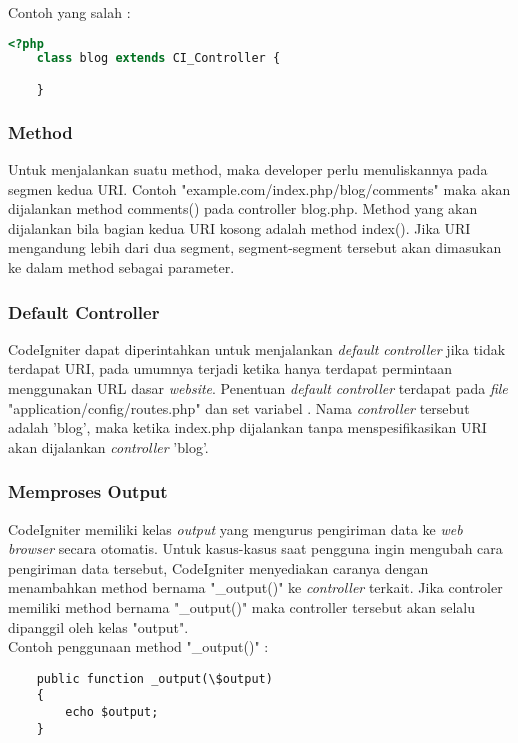 Contoh yang salah :
\begin{lstlisting}[language=PHP]
	<?php
	class blog extends CI_Controller {

	}
\end{lstlisting}
	\subsubsection{Method}
	Untuk menjalankan suatu method, maka developer perlu menuliskannya pada segmen kedua URI. Contoh "example.com/index.php/blog/comments" maka akan dijalankan method comments() pada controller blog.php. Method yang akan dijalankan bila bagian kedua URI kosong adalah method index(). Jika URI mengandung lebih dari dua segment, segment-segment tersebut akan dimasukan ke dalam method sebagai parameter. \cite{CodeIgniter:17}
	
	\subsubsection{Default Controller}
	CodeIgniter dapat diperintahkan untuk menjalankan \textit{default controller} jika tidak terdapat URI, pada umumnya terjadi ketika hanya terdapat permintaan menggunakan URL dasar \textit{website}. Penentuan \textit{default controller} terdapat pada \textit{file} "application/config/routes.php" dan set variabel . Nama \textit{controller} tersebut adalah 'blog', maka ketika index.php dijalankan tanpa menspesifikasikan URI akan dijalankan \textit{controller} 'blog'.\cite{CodeIgniter:17}
	
	\subsubsection{Memproses Output}
	CodeIgniter memiliki kelas \textit{output} yang mengurus pengiriman data ke \textit{web browser} secara otomatis. Untuk kasus-kasus saat pengguna ingin mengubah cara pengiriman data tersebut, CodeIgniter menyediakan caranya dengan menambahkan method bernama "\_output()" ke \textit{controller} terkait. Jika controler memiliki method bernama "\_output()" maka controller tersebut akan  selalu dipanggil oleh kelas "output".\cite{CodeIgniter:17} \\
Contoh penggunaan method "\_output()" : 
\begin{lstlisting}
	public function _output(\$output)
	{
        echo $output;
	}
\end{lstlisting}

